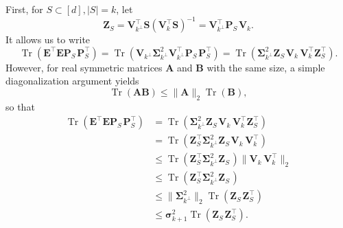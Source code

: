 \documentclass[twoside,11pt]{book}
\numberwithin{theorem}{chapter}
\numberwithin{definition}{chapter}
\numberwithin{proposition}{chapter}
\numberwithin{corollary}{chapter}
\numberwithin{example}{chapter}
\numberwithin{lemma}{chapter}
\numberwithin{assumption}{chapter}
\DeclareMathOperator{\Tr}{Tr}
\DeclareMathOperator{\Tran}{\intercal}
\begin{document}
First, for $S \subset [d], |S| =k$, let
$$
\bm{Z}_{S} = \bm{V}_{k^{\perp}}^{\Tran} \bm{S}(\bm{V}_{k}^{\Tran}\bm{S})^{-1} = \bm{V}_{k^{\perp}}^{\Tran} \bm{P}_{S}^{\phantom{\Tran}} \bm{V}_{k}.
$$
It allows us to write
\begin{equation}
	\Tr(\bm{E}^{\Tran}\bm{E}\bm{P}^{\phantom{\Tran}}_{S}\bm{P}^{\Tran}_{S})= \Tr(\bm{V}_{k^{\perp}}\bm{\Sigma}_{k^{\perp}}		^{2}\bm{V}_{k^{\perp}}^{\Tran}\bm{P}^{\phantom{\Tran}}_{S}\bm{P}^{\Tran}_{S}) = \Tr(\bm{\Sigma}_{k^{\perp}}^{2}\bm{Z}_{S}^{\phantom{\Tran}}\bm{V}_{k}^{\phantom{\Tran}}\bm{V}_{k}^{\Tran}\bm{Z}_{S}^{\Tran}).
\end{equation}
However, for real symmetric matrices $\bm{A}$ and $\bm{B}$ with the same size, a simple diagonalization argument yields
\begin{equation}
	\Tr(\bm{A}\bm{B}) \leq \|\bm{A}\|_{2}\Tr(\bm{B}),
\end{equation}
so that
\begin{align}\label{eq:majoration_by_sigma_k_1}
\Tr(\bm{E}^{\Tran}\bm{E}\bm{P}^{\phantom{\Tran}}_{S}\bm{P}^{\Tran}_{S}) & = \Tr(\bm{\Sigma}_{k^{\perp}}^{2}\bm{Z}_{S}^{\phantom{\Tran}}\bm{V}_{k}^{\phantom{\Tran}}\bm{V}_{k}^{\Tran}\bm{Z}_{S}^{\Tran}) \nonumber\\
& = \Tr(\bm{Z}_{S}^{\Tran}\bm{\Sigma}_{k^{\perp}}^{2}\bm{Z}_{S}^{\phantom{\Tran}}\bm{V}_{k}^{\phantom{\Tran}}\bm{V}_{k}^{\Tran}) \nonumber\\
& \leq \Tr(\bm{Z}_{S}^{\Tran}\bm{\Sigma}_{k^{\perp}}^{2}\bm{Z}_{S}^{\phantom{\Tran}}) \|\bm{V}_{k}^{\phantom{\Tran}}\bm{V}_{k}^{\Tran}\|_{2} \nonumber\\
& \leq \Tr(\bm{Z}_{S}^{\Tran}\bm{\Sigma}_{k^{\perp}}^{2}\bm{Z}_{S}^{\phantom{\Tran}}) \nonumber \\
& \leq \|\bm{\Sigma}_{k^{\perp}}^{2}\|_{2}\Tr(\bm{Z}_{S}^{\phantom{\Tran}}\bm{Z}_{S}^{\Tran}) \nonumber \\
& \leq \bm{\sigma}_{k+1}^{2} \Tr(\bm{Z}_{S}^{\phantom{\Tran}}\bm{Z}_{S}^{\Tran}).
\end{align}
\end{document}
